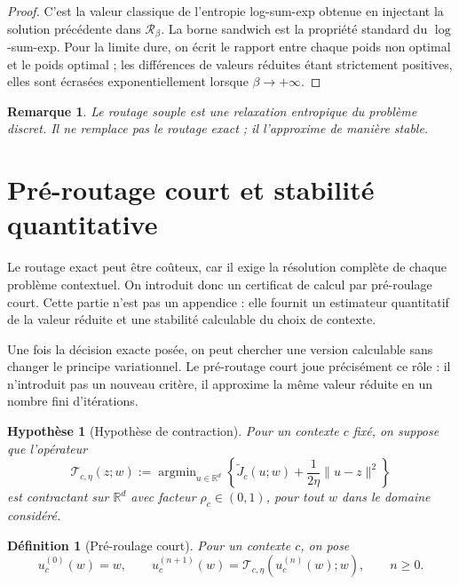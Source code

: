 \documentclass[11pt,a4paper]{article}
\newtheorem{definition}{Définition}[section]
\newtheorem{assumption}{Hypothèse}[section]
\newtheorem{remark}{Remarque}[section]
\DeclareMathOperator{\argmin}{argmin}
\newcommand{\R}{\mathbb R}
\newcommand{\Tcal}{\mathcal T}
\newcommand{\Rcal}{\mathcal R}
\begin{document}
\begin{proof}
C'est la valeur classique de l'entropie log-sum-exp obtenue en injectant la solution précédente dans \(\Rcal_\beta\). La borne sandwich est la propriété standard du \(\log\)-sum-exp. Pour la limite dure, on écrit le rapport entre chaque poids non optimal et le poids optimal ; les différences de valeurs réduites étant strictement positives, elles sont écrasées exponentiellement lorsque \(\beta\to+\infty\).
\end{proof}

\begin{remark}
Le routage souple est une relaxation entropique du problème discret. Il ne remplace pas le routage exact ; il l'approxime de manière stable.
\end{remark}

\section{Pré-routage court et stabilité quantitative}

Le routage exact peut être coûteux, car il exige la résolution complète de chaque problème contextuel. On introduit donc un certificat de calcul par pré-roulage court. Cette partie n'est pas un appendice : elle fournit un estimateur quantitatif de la valeur réduite et une stabilité calculable du choix de contexte.

Une fois la décision exacte posée, on peut chercher une version calculable sans changer le principe variationnel. Le pré-routage court joue précisément ce rôle : il n'introduit pas un nouveau critère, il approxime la même valeur réduite en un nombre fini d'itérations.

\begin{assumption}[Hypothèse de contraction]
Pour un contexte \(c\) fixé, on suppose que l'opérateur
\[
\Tcal_{c,\eta}(z;w):=\argmin_{u\in\R^d}\left\{\widetilde J_c(u;w)+\frac{1}{2\eta}\|u-z\|^2\right\}
\]
est contractant sur \(\R^d\) avec facteur \(\rho_c\in(0,1)\), pour tout \(w\) dans le domaine considéré.
\end{assumption}

\begin{definition}[Pré-roulage court]
Pour un contexte \(c\), on pose
\[
u_c^{(0)}(w)=w,
\qquad
u_c^{(n+1)}(w)=\Tcal_{c,\eta}(u_c^{(n)}(w);w),
\qquad n\ge 0.
\]
\end{definition}
\end{document}
